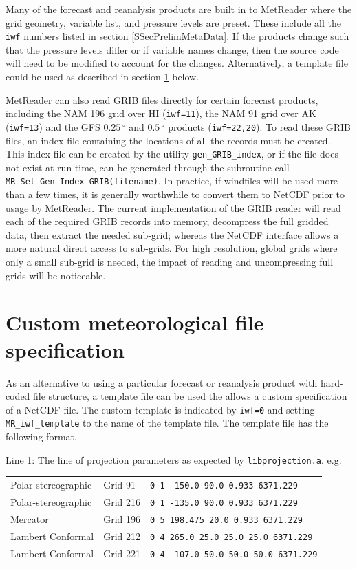 \documentclass[11pt]{article}   %
\begin{document}
Many of the forecast and reanalysis products are built in to MetReader where the
grid geometry, variable list, and pressure levels are preset.  These include all
the \texttt{iwf} numbers listed in section \ref{SSecPrelimMetaData}.  If the
products change such that the pressure levels differ or if variable names change,
then the source code will need to be modified to account for the changes.
Alternatively, a template file could be used as described in section \ref{SecCust} below.

MetReader can also read GRIB files directly for certain forecast products, including the
NAM 196 grid over HI (\texttt{iwf=11}), the NAM 91 grid over AK
(\texttt{iwf=13}) and the GFS $0.25 \, ^{\circ}$ and $0.5 \, ^{\circ}$
products (\texttt{iwf=22,20}).  To read these GRIB files, an index
file containing the locations of all the records must be created.
This index file can be created 
by the utility \texttt{gen\_GRIB\_index}, or if the file does not exist at
run-time, can be generated through the subroutine call
\texttt{MR\_Set\_Gen\_Index\_GRIB(filename)}.  In practice, if windfiles will be used
more than a few times, it is generally worthwhile to convert them to NetCDF prior
to usage by MetReader.  The current
implementation of the GRIB reader will read each of the required GRIB records into
memory, decompress the full gridded data, then extract the needed sub-grid; whereas the 
NetCDF interface allows a more natural direct access to sub-grids.  For high resolution,
global grids where only a small sub-grid is needed, the impact of reading and uncompressing
full grids will be noticeable.

\section{Custom meteorological file specification}\label{SecCust}
As an alternative to using a particular forecast or reanalysis product with
hard-coded file structure, a template file can be used the allows a custom
specification of a NetCDF file.
The custom template is indicated by \texttt{iwf=0} and setting \texttt{MR\_iwf\_template}
to the name of the template file.  The template file has the following format.

Line 1: The line of projection parameters as expected by \texttt{libprojection.a}.
e.g.
\\
\begin{tabular}{ l  l  l }
Polar-stereographic & Grid 91  & \verb|0 1 -150.0 90.0 0.933 6371.229| \\
Polar-stereographic & Grid 216 & \verb|0 1 -135.0 90.0 0.933 6371.229| \\
Mercator            & Grid 196 & \verb|0 5 198.475 20.0 0.933 6371.229| \\
Lambert Conformal   & Grid 212 & \verb|0 4 265.0 25.0 25.0 25.0 6371.229| \\
Lambert Conformal   & Grid 221 & \verb|0 4 -107.0 50.0 50.0 50.0 6371.229| \\
\end{tabular}
\end{document}
